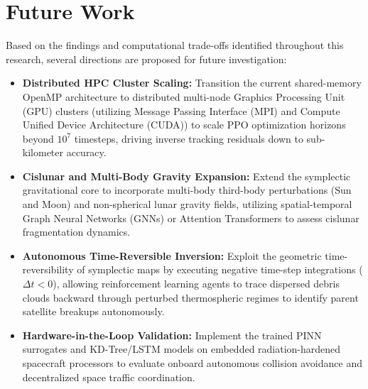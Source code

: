 \section{Future Work}
Based on the findings and computational trade-offs identified throughout this research, several directions are proposed for future investigation:
\begin{itemize}
    \item \textbf{Distributed HPC Cluster Scaling:} Transition the current shared-memory OpenMP architecture to distributed multi-node Graphics Processing Unit (GPU) clusters (utilizing Message Passing Interface (MPI) and Compute Unified Device Architecture (CUDA)) to scale PPO optimization horizons beyond $10^7$ timesteps, driving inverse tracking residuals down to sub-kilometer accuracy.
    \item \textbf{Cislunar and Multi-Body Gravity Expansion:} Extend the symplectic gravitational core to incorporate multi-body third-body perturbations (Sun and Moon) and non-spherical lunar gravity fields, utilizing spatial-temporal Graph Neural Networks (GNNs) or Attention Transformers to assess cislunar fragmentation dynamics.
    \item \textbf{Autonomous Time-Reversible Inversion:} Exploit the geometric time-reversibility of symplectic maps by executing negative time-step integrations ($\Delta t < 0$), allowing reinforcement learning agents to trace dispersed debris clouds backward through perturbed thermospheric regimes to identify parent satellite breakups autonomously.
    \item \textbf{Hardware-in-the-Loop Validation:} Implement the trained PINN surrogates and KD-Tree/LSTM models on embedded radiation-hardened spacecraft processors to evaluate onboard autonomous collision avoidance and decentralized space traffic coordination.
\end{itemize}

\clearpage